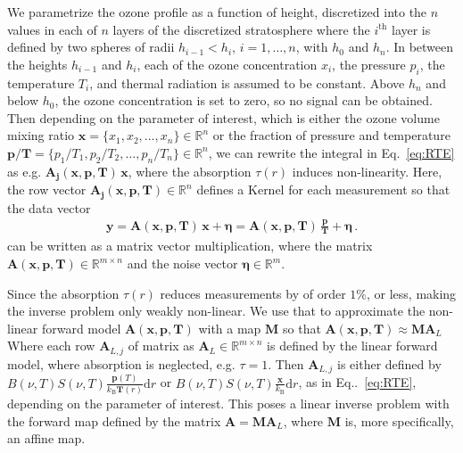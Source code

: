 We parametrize the ozone profile as a function of height, discretized into the $n$ values in each of $n$ layers of the discretized stratosphere where the $i^\text{th}$ layer is defined by two spheres of radii  $h_{i-1} < h_{i}$, $i = 1, \dots, n$, with $h_0$ and $h_{n} $.
In between the heights $h_{i-1}$ and $h_{i}$, each of the ozone concentration $x_{i}$, the pressure $p_{i}$, the temperature $T_{i}$, and thermal radiation is assumed to be constant.
Above $h_{n}$ and below $h_0$, the ozone concentration is set to zero, so no signal can be obtained.
Then depending on the parameter of interest, which is either the ozone volume mixing ratio $\bm{x} =\{x_1,x_2,\ldots,x_n\} \in \mathbb{R}^{n}$ or the fraction of pressure and temperature $\bm{p/T}= \{p_1/T_1,p_2/T_2,\ldots,p_n/T_n\} \in \mathbb{R}^{n} $, we can rewrite the integral in Eq.~\eqref{eq:RTE} as e.g. $\bm{A_{j}}(\bm{x},  \bm{p},\bm{T}) \, \bm{x} $, where the absorption $\tau(r)$ induces non-linearity.
Here, the row vector $\bm{A_{j}}(\bm{x},  \bm{p},\bm{T}) \in \mathbb{R}^{n}$  defines a Kernel for each measurement so that the data vector
\begin{align}
	\bm{y} = \bm{A}(\bm{x},  \bm{p},\bm{T}) \, \bm{x} + \bm{\eta}= \bm{A}(\bm{x},  \bm{p},\bm{T}) \,
	\frac{ \bm{p}}{\bm{T}} + \bm{\eta} \, .
\end{align}
can be written as a matrix vector multiplication, where the matrix $\bm{A}(\bm{x},  \bm{p},\bm{T}) \in \mathbb{R}^{m \times n}$  and the noise vector $\bm{\eta} \in \mathbb{R}^{m}$.

Since the absorption $\tau(r)$ reduces measurements by of order $1\%$, or less, making the inverse problem only weakly non-linear. 
We use that to approximate the non-linear forward model $\bm{A}(\bm{x},  \bm{p},\bm{T})$ with a map $\bm{M}$ so that $\bm{A}(\bm{x},  \bm{p},\bm{T}) \approx \bm{M} \bm{A}_L $
Where each row $\bm{A}_{L,j} $ of matrix as $\bm{A}_L \in \mathbb{R}^{m \times n}$ is defined by the linear forward model, where absorption is neglected, e.g. $\tau = 1$. 
Then $\bm{A}_{L,j} $ is either defined by $ B(\nu,T) S(\nu, T)   \frac{\bm{p}(T)}{k_{\text{B}} \bm{T}(r)}  \text{d}r$ or $B(\nu,T) S(\nu, T)   \frac{\bm{x}}{k_{\text{B}}}  \text{d}r$, as in Eq..~\eqref{eq:RTE}, depending on the parameter of interest.
This poses a linear inverse problem with the forward map defined by the matrix $\bm{A} = \bm{M} \bm{A}_L$, where $\bm{M}$ is, more specifically, an affine map.


